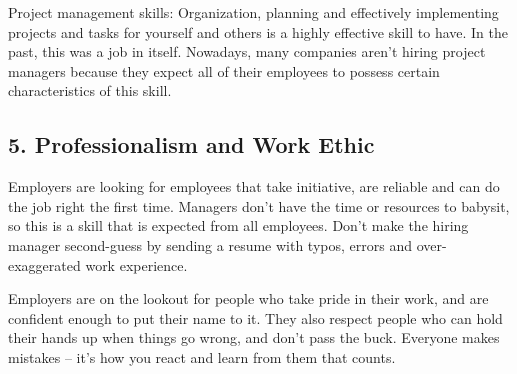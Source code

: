 \documentclass[letterpaper,10pt]{memoir}
\begin{document}
	Project management skills: Organization, planning and effectively implementing projects and tasks for yourself and others is a highly effective skill to have. In the past, this was a job in itself. Nowadays, many companies aren't hiring project managers because they expect all of their employees to possess certain characteristics of this skill.


	\subsection*{5. Professionalism and Work Ethic}
	Employers are looking for employees that take initiative, are reliable and can do the job right the first time. Managers don't have the time or resources to babysit, so this is a skill that is expected from all employees. Don't make the hiring manager second-guess by sending a resume with typos, errors and over-exaggerated work experience.

	Employers are on the lookout for people who take pride in their work, and are confident enough to put their name to it. They also respect people who can hold their hands up when things go wrong, and don't pass the buck. Everyone makes mistakes -- it's how you react and learn from them that counts.
\end{document}
